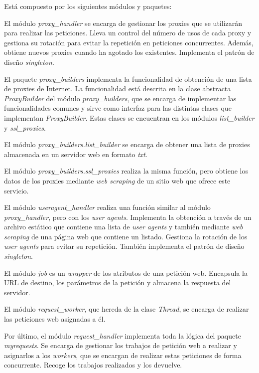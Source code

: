 Está compuesto por los siguientes módulos y paquetes:

El módulo \textit{proxy\_handler} se encarga de gestionar los proxies que se utilizarán para
realizar las peticiones. Lleva un control del número de usos de cada proxy y gestiona su rotación
para evitar la repetición en peticiones concurrentes. Además, obtiene nuevos proxies cuando ha
agotado los existentes. Implementa el patrón de diseño \textit{singleton}.

El paquete \textit{proxy\_builders} implementa la funcionalidad de obtención de una lista de
proxies de Internet. La funcionalidad está descrita en la clase abstracta \textit{ProxyBuilder} del módulo \textit{proxy\_builders},
que se encarga de implementar las funcionalidades comunes y sirve como interfaz para las distintas
clases que implementan \textit{ProxyBuilder}. Estas clases se encuentran en los
módulos \textit{list\_builder} y \textit{ssl\_proxies}.

El módulo \textit{proxy\_builders.list\_builder} se encarga de obtener una lista de proxies almacenada en un
servidor web en formato \textit{txt}.

El módulo \textit{proxy\_builders.ssl\_proxies} realiza la misma función, pero obtiene los datos de los
proxies mediante \textit{web scraping} de un sitio web que ofrece este servicio.

El módulo \textit{useragent\_handler} realiza una función similar al
módulo \textit{proxy\_handler}, pero con los \textit{user agents}. Implementa la obtención a
través de un archivo estático que contiene una lista de \textit{user agents} y también mediante \textit{web scraping} de una página web que contiene un listado. Gestiona la rotación de los \textit{user agents} para evitar su repetición. También implementa el patrón de diseño \textit{singleton}.

El módulo \textit{job} es un \textit{wrapper} de los atributos de una petición web.
Encapsula la URL de destino, los parámetros de la petición y almacena la respuesta del servidor.

El módulo \textit{request\_worker}, que hereda de la clase \textit{Thread}, se encarga de
realizar las peticiones web asignadas a él.

Por último, el módulo \textit{request\_handler} implementa toda la lógica del
paquete \textit{myrequests}. Se encarga de gestionar los trabajos de petición web a realizar y
asignarlos a los \textit{workers}, que se encargan de realizar estas peticiones de forma concurrente.
Recoge los trabajos realizados y los devuelve.

